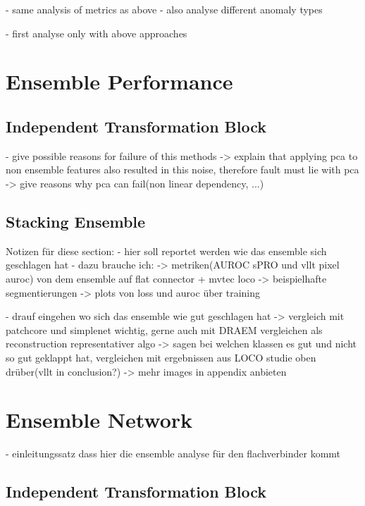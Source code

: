 - same analysis of metrics as above
- also analyse different anomaly types

- first analyse only with above approaches



\section{Ensemble Performance}
\label{sec:ensemblediscussion}

\subsection{Independent Transformation Block}
\label{subsec:ITBfaildiscussion}

- give possible reasons for failure of this methods
-> explain that applying pca to non ensemble features also resulted in this noise, therefore fault must lie with pca
-> give reasons why pca can fail(non linear dependency, ...)


\subsection{Stacking Ensemble}
\label{subsec:stackingdiscussion}


Notizen für diese section:
- hier soll reportet werden wie das ensemble sich geschlagen hat
- dazu brauche ich:
-> metriken(AUROC sPRO und vllt pixel auroc) von dem ensemble auf flat connector + mvtec loco
-> beispielhafte segmentierungen
-> plots von loss und auroc über training

- drauf eingehen wo sich das ensemble wie gut geschlagen hat
-> vergleich mit patchcore und simplenet wichtig, gerne auch mit DRAEM vergleichen als reconstruction representativer algo
-> sagen bei welchen klassen es gut und nicht so gut geklappt hat, vergleichen mit ergebnissen aus LOCO studie oben drüber(vllt in conclusion?)
-> mehr images in appendix anbieten




\section{Ensemble Network}
\label{sec:ensembleconclusion}

- einleitungssatz dass hier die ensemble analyse für den flachverbinder kommt

\subsection{Independent Transformation Block}
\label{subsec:ITBfailconc}

